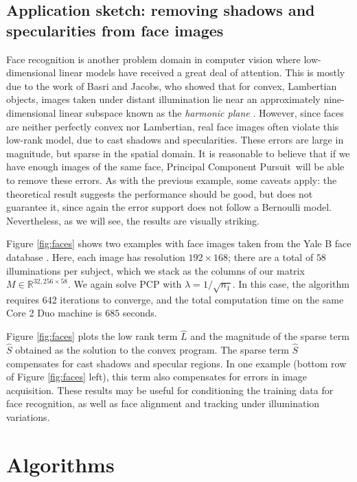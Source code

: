 \subsection{Application sketch: removing shadows and specularities from face images} Face recognition is another problem domain in computer vision where low-dimensional linear models have received a great deal of attention. This is mostly due to the work of Basri and Jacobs, who showed that for convex, Lambertian objects, images taken under distant illumination lie near an approximately nine-dimensional linear subspace known as the {\em harmonic plane} \cite{Basri2003-PAMI}. However, since faces are neither perfectly convex nor Lambertian, real face images often violate this low-rank model, due to cast shadows and specularities. These errors are large in magnitude, but sparse in the spatial domain. It is reasonable to believe that if we have enough images of the same face, Principal Component Pursuit\, will be able to remove these errors. As with the previous example, some caveats apply: the theoretical result suggests the performance should be good, but does not guarantee it, since again the error support does not follow a Bernoulli model. Nevertheless, as we will see, the results are visually striking.

Figure \ref{fig:faces} shows two examples with face images taken from the Yale B face database \cite{Georghiades2001-PAMI}. Here, each image has resolution $192 \times 168$; there are a total of $58$ illuminations per subject, which we stack as the columns of our matrix $M \in \mathbb{R}^{32,256 \times 58}$. We again solve PCP with $\lambda = 1/\sqrt{n_1}$. In this case, the algorithm requires 642 iterations to converge, and the total computation time on the same Core 2 Duo machine is $685$ seconds.

Figure \ref{fig:faces} plots the low rank term $\hat L$ and the magnitude of the sparse term $\hat S$ obtained as the solution to the convex program. The sparse term $\hat S$ compensates for cast shadows and specular regions. In one example (bottom row of Figure
\ref{fig:faces} left), this term also compensates for errors in image acquisition. These results may be useful for conditioning the training data for face recognition, as well as face alignment and tracking under illumination variations.

\section{Algorithms} \label{sec:algorithms}

